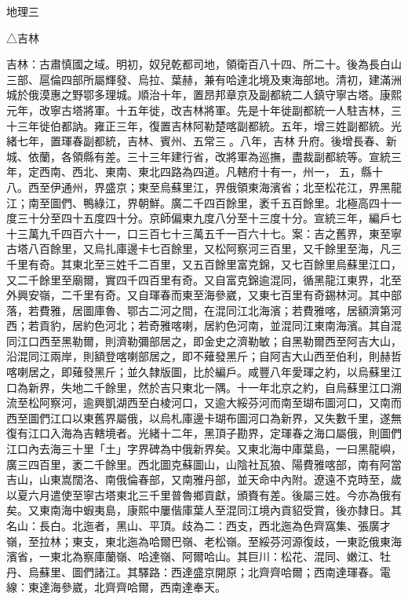 
\begin{pinyinscope}
地理三

△吉林

吉林：古肅慎國之域。明初，奴兒乾都司地，領衛百八十四、所二十。後為長白山三部、扈倫四部所屬輝發、烏拉、葉赫，兼有哈達北境及東海部地。清初，建滿洲城於俄漠惠之野鄂多理城。順治十年，置昂邦章京及副都統二人鎮守寧古塔。康熙元年，改寧古塔將軍。十五年徙，改吉林將軍。先是十年徙副都統一人駐吉林，三十三年徙伯都訥。雍正三年，復置吉林阿勒楚喀副都統。五年，增三姓副都統。光緒七年，置琿春副都統，吉林、賓州、五常三。八年，吉林升府。後增長春、新城、依蘭，各領縣有差。三十三年建行省，改將軍為巡撫，盡裁副都統等。宣統三年，定西南、西北、東南、東北四路為四道。凡轄府十有一，州一，五，縣十八。西至伊通州，界盛京；東至烏蘇里江，界俄領東海濱省；北至松花江，界黑龍江；南至圖們、鴨綠江，界朝鮮。廣二千四百餘里，袤千五百餘里。北極高四十一度三十分至四十五度四十分。京師偏東九度八分至十三度十分。宣統三年，編戶七十三萬九千四百六十一，口三百七十三萬五千一百六十七。案：吉之舊界，東至寧古塔八百餘里，又烏扎庫邊卡七百餘里，又松阿察河三百里，又千餘里至海，凡三千里有奇。其東北至三姓千二百里，又五百餘里富克錦，又七百餘里烏蘇里江口，又二千餘里至廟爾，實四千四百里有奇。又自富克錦逾混同，循黑龍江東界，北至外興安嶺，二千里有奇。又自琿春而東至海參崴，又東七百里有奇錫林河。其中部落，若費雅，居圖庫魯、鄂古二河之間，在混同江北海濱；若費雅喀，居額濟第河西；若貢豹，居約色河北；若奇雅喀喇，居約色河南，並混同江東南海濱。其自混同江口西至黑勒爾，則濟勒彌部居之，即金史之濟勒敏；自黑勒爾西至阿吉大山，沿混同江兩岸，則額登喀喇部居之，即不薙發黑斤；自阿吉大山西至伯利，則赫哲喀喇居之，即薙發黑斤；並久隸版圖，比於編戶。咸豐八年愛琿之約，以烏蘇里江口為新界，失地二千餘里，然於吉只東北一隅。十一年北京之約，自烏蘇里江口溯流至松阿察河，逾興凱湖西至白棱河口，又逾大綏芬河而南至瑚布圖河口，又南而西至圖們江口以東舊界屬俄，以烏札庫邊卡瑚布圖河口為新界，又失數千里，遂無復有江口入海為吉轄境者。光緒十二年，黑頂子勘界，定琿春之海口屬俄，則圖們江口內去海三十里「土」字界碑為中俄新界矣。又東北海中庫葉島，一曰黑龍嶼，廣三四百里，袤二千餘里。西北圖克蘇圖山，山陰社瓦狼、陽費雅喀部，南有阿當吉山，山東嵩闊洛、南俄倫春部，又南雅丹部，並天命中內附。遼遠不克時至，歲以夏六月遣使至寧古塔東北三千里普魯鄉貢獻，頒賚有差。後屬三姓。今亦為俄有矣。又東南海中蝦夷島，康熙中屢偕庫葉人至混同江境內貢貂受賞，後亦隸日。其名山：長白。北迤者，黑山、平頂。歧為二：西支，西北迤為色齊窩集、張廣才嶺，至拉林；東支，東北迤為哈爾巴嶺、老松嶺。至綏芬河源復歧，一東訖俄東海濱省，一東北為察庫蘭嶺、哈達嶺、阿爾哈山。其巨川：松花、混同、嫩江、牡丹、烏蘇里、圖們諸江。其驛路：西達盛京開原；北齊齊哈爾；西南達琿春。電線：東達海參崴，北齊齊哈爾，西南達奉天。


\end{pinyinscope}
